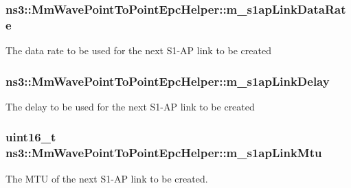 \subsubsection[{\texorpdfstring{m\+\_\+s1ap\+Link\+Data\+Rate}{m_s1apLinkDataRate}}]{ ns3\+::\+Mm\+Wave\+Point\+To\+Point\+Epc\+Helper\+::m\+\_\+s1ap\+Link\+Data\+Rate\hspace{0.3cm}{\ttfamily [private]}}\hypertarget{classns3_1_1MmWavePointToPointEpcHelper_a44dd93ffe2c0e326f3fd61e132c59f24}{}\label{classns3_1_1MmWavePointToPointEpcHelper_a44dd93ffe2c0e326f3fd61e132c59f24}
The data rate to be used for the next S1-\/\+AP link to be created 
\subsubsection[{\texorpdfstring{m\+\_\+s1ap\+Link\+Delay}{m_s1apLinkDelay}}]{ ns3\+::\+Mm\+Wave\+Point\+To\+Point\+Epc\+Helper\+::m\+\_\+s1ap\+Link\+Delay\hspace{0.3cm}{\ttfamily [private]}}\hypertarget{classns3_1_1MmWavePointToPointEpcHelper_a1fe106e13b5ec03c2e14d91abff84f7e}{}\label{classns3_1_1MmWavePointToPointEpcHelper_a1fe106e13b5ec03c2e14d91abff84f7e}
The delay to be used for the next S1-\/\+AP link to be created 
\subsubsection[{\texorpdfstring{m\+\_\+s1ap\+Link\+Mtu}{m_s1apLinkMtu}}]{\setlength{\rightskip}{0pt plus 5cm}uint16\+\_\+t ns3\+::\+Mm\+Wave\+Point\+To\+Point\+Epc\+Helper\+::m\+\_\+s1ap\+Link\+Mtu\hspace{0.3cm}{\ttfamily [private]}}\hypertarget{classns3_1_1MmWavePointToPointEpcHelper_a5c9ee81e5708d30dc59e1f66bcfe226b}{}\label{classns3_1_1MmWavePointToPointEpcHelper_a5c9ee81e5708d30dc59e1f66bcfe226b}
The M\+TU of the next S1-\/\+AP link to be created. 
